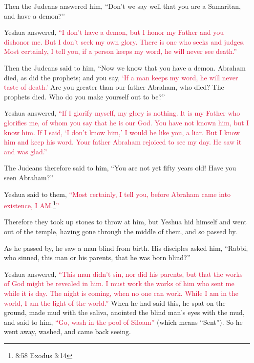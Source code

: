 \myverse{}Then the Judeans answered him, “Don’t we say well that you are
a Samaritan, and have a demon?”

\myverse{}Yeshua answered,
\textcolor{crimson}{“I don’t have a demon, but I honor my Father and you dishonor me.
}
\myverse{}\textcolor{crimson}{But I don’t seek my own glory. There is one who seeks and judges.
}
\myverse{}\textcolor{crimson}{Most certainly, I tell you, if a person keeps my word, he will never see
	death.”}

\myverse{}Then the Judeans said to him, “Now we know that you have a demon.
Abraham died, as did the prophets; and you say,
\textcolor{crimson}{‘If a man keeps my word, he will never taste of death.’}
\myverse{}Are you greater than our father Abraham, who died? The prophets died. Who
do you make yourself out to be?”

\myverse{}Yeshua answered,
\textcolor{crimson}{“If I glorify myself, my glory is nothing. It is my Father who glorifies me, of whom you say that
	he is our God.
}
\myverse{}\textcolor{crimson}{You have not known him, but I know him. If I said, ‘I don’t know him,’
	I would be like you, a liar. But I know him and keep his word.
}
\myverse{}\textcolor{crimson}{Your father Abraham rejoiced to see my day. He saw it and was glad.”}

\myverse{}The Judeans therefore said to him, “You are not yet fifty years
old! Have you seen Abraham?”

\myverse{}Yeshua said to them,
\textcolor{crimson}{“Most certainly, I tell you, before Abraham came into existence, I AM.}\footnote{8:58 Exodus 3:14}\textcolor{crimson}{”}

\myverse{}Therefore they took up stones to throw at him, but Yeshua hid
himself and went out of the temple, having gone through the middle of them, and so passed by.


\mychapter{} \myverse*{}As he passed by, he saw a man blind from birth.
\myverse{}His disciples asked him, “Rabbi, who sinned, this man or his parents, that he
was born blind?”

\myverse{}Yeshua answered,
\textcolor{crimson}{“This man didn’t sin, nor did his parents, but that the works of God might be revealed in him.
}
\myverse{}\textcolor{crimson}{I must work the works of him who sent me while it is day. The night is coming,
	when no one can work.
}
\myverse{}\textcolor{crimson}{While I am in the world, I am the light of the world.”}
\myverse{}When he had said this, he spat on the ground, made mud with the saliva, anointed
the blind man’s eyes with the mud,
\myverse{}and said to him,
\textcolor{crimson}{“Go, wash in the pool of Siloam”} (which means “Sent”). So he went away, washed, and came back
seeing.

